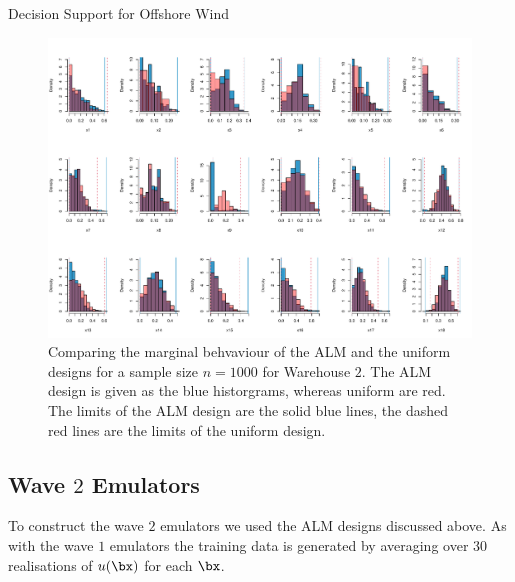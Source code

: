 \begin{chapter}{Decision Support for Offshore Wind \label{Ch:ds-for-ow}}
\begin{figure}
  \includegraphics[width = 7.5in, angle = 90]{fig-ds/alm-vs-unif2.pdf}
  \caption{Comparing the marginal behvaviour of the ALM and the uniform designs for a sample size $n = 1000$ for Warehouse $2$. The ALM  design is given as the blue historgrams, whereas uniform are red. The limits of the ALM  design are the solid blue lines, the dashed red lines are the limits of the uniform design.\label{Fig:alm-vs-unif2}}
\end{figure}
\subsection{Wave $2$ Emulators}

To construct the wave $2$ emulators we used the ALM designs discussed above. As with the wave $1$ emulators the training data is generated by averaging over $30$ realisations of $u(\bx)$ for each $\bx$.


\end{chapter}
